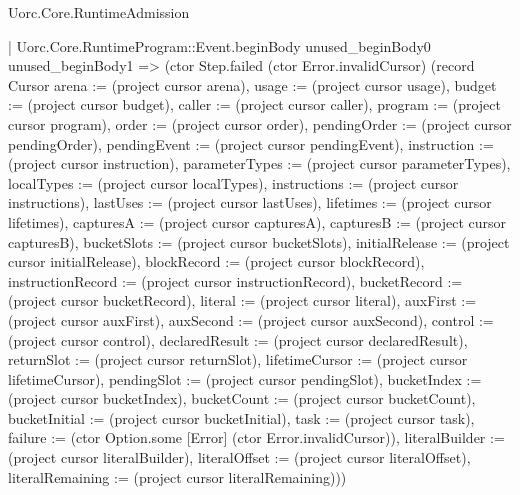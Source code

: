 \begin{lexlean}{Uorc.Core.RuntimeAdmission}
\begin{semanticmodule}
{          | Uorc.Core.RuntimeProgram::Event.beginBody unused_beginBody0 unused_beginBody1 => (ctor Step.failed (ctor Error.invalidCursor) (record Cursor {arena := (project cursor arena), usage := (project cursor usage), budget := (project cursor budget), caller := (project cursor caller), program := (project cursor program), order := (project cursor order), pendingOrder := (project cursor pendingOrder), pendingEvent := (project cursor pendingEvent), instruction := (project cursor instruction), parameterTypes := (project cursor parameterTypes), localTypes := (project cursor localTypes), instructions := (project cursor instructions), lastUses := (project cursor lastUses), lifetimes := (project cursor lifetimes), capturesA := (project cursor capturesA), capturesB := (project cursor capturesB), bucketSlots := (project cursor bucketSlots), initialRelease := (project cursor initialRelease), blockRecord := (project cursor blockRecord), instructionRecord := (project cursor instructionRecord), bucketRecord := (project cursor bucketRecord), literal := (project cursor literal), auxFirst := (project cursor auxFirst), auxSecond := (project cursor auxSecond), control := (project cursor control), declaredResult := (project cursor declaredResult), returnSlot := (project cursor returnSlot), lifetimeCursor := (project cursor lifetimeCursor), pendingSlot := (project cursor pendingSlot), bucketIndex := (project cursor bucketIndex), bucketCount := (project cursor bucketCount), bucketInitial := (project cursor bucketInitial), task := (project cursor task), failure := (ctor Option.some [Error] (ctor Error.invalidCursor)), literalBuilder := (project cursor literalBuilder), literalOffset := (project cursor literalOffset), literalRemaining := (project cursor literalRemaining)}))
}
\end{semanticmodule}
\end{lexlean}
